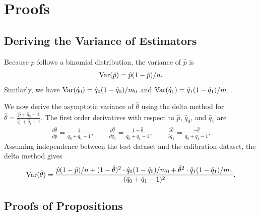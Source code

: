 \section{Proofs}
\label{appendix:proof}


\subsection{Deriving the Variance of Estimators}
\label{appendix:proof:var}

Because $p$ follows a binomial distribution, the variance of $\hat{p}$ is
\begin{align}
    \displaystyle \mathrm{Var} (\hat{p})
    = \hat{p}(1 - \hat{p})/ n
    .
\end{align}
Similarly, we have $\displaystyle \mathrm{Var} (\hat{q}_0) = \hat{q}_0(1 - \hat{q}_0)/m_0$ and $\displaystyle \mathrm{Var} (\hat{q}_1) = \hat{q}_1(1 - \hat{q}_1)/m_1$.

We now derive the asymptotic variance of $\hat{\theta}$ using the delta method \citep{dorfman1938note, ver2012invented} for $\hat{\theta} = \frac{\hat{p} + \hat{q}_0 - 1}{\hat{q}_0 + \hat{q}_1 - 1}$. The first order derivatives with respect to $\hat{p}$, $\hat{q}_0$, and $\hat{q}_1$ are 
\begin{align}
    \frac{\partial \hat{\theta}}{\partial \hat{p}}
    =
    \frac{ 1 }{\hat{q}_0 + \hat{q}_1 - 1}
    ,\qquad
    \frac{\partial \hat{\theta}}{\partial \hat{q}_0}
    =
    \frac{ 1 - \hat{\theta}}{\hat{q}_0 + \hat{q}_1 - 1}
    ,\qquad
    \frac{\partial \hat{\theta}}{\partial \hat{q}_1}
    =
    \frac{ -\hat{\theta}}{\hat{q}_0 + \hat{q}_1 - 1}
    .
\end{align}
Assuming independence between the test dataset and the calibration dataset, the delta method gives
\begin{align}
    \displaystyle \mathrm{Var} (\hat{\theta})
    =
    \frac{
    \hat{p}(1 - \hat{p})/n
    + (1 - \hat{\theta})^2 \cdot \hat{q}_0(1 - \hat{q}_0)/m_0
    + \hat{\theta}^2 \cdot \hat{q}_1(1 - \hat{q}_1)/m_1
    }{
    (\hat{q}_0 + \hat{q}_1 - 1)^2
    } .
\end{align}

\clearpage
\subsection{Proofs of Propositions}

